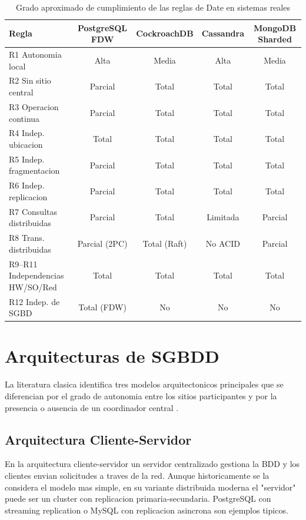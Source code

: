 \documentclass[11pt,a4paper]{article}
\begin{document}
\begin{table}[H]
\centering
\caption{Grado aproximado de cumplimiento de las reglas de Date en sistemas reales}
\small
\begin{tabular}{lcccc}
\toprule
\textbf{Regla} & \textbf{PostgreSQL FDW} & \textbf{CockroachDB} & \textbf{Cassandra} & \textbf{MongoDB Sharded} \\
\midrule
R1 Autonomia local & Alta & Media & Alta & Media \\
R2 Sin sitio central & Parcial & Total & Total & Total \\
R3 Operacion continua & Parcial & Total & Total & Total \\
R4 Indep. ubicacion & Total & Total & Total & Total \\
R5 Indep. fragmentacion & Parcial & Total & Total & Total \\
R6 Indep. replicacion & Parcial & Total & Total & Total \\
R7 Consultas distribuidas & Parcial & Total & Limitada & Parcial \\
R8 Trans. distribuidas & Parcial (2PC) & Total (Raft) & No ACID & Parcial \\
R9--R11 Independencias HW/SO/Red & Total & Total & Total & Total \\
R12 Indep. de SGBD & Total (FDW) & No & No & No \\
\bottomrule
\end{tabular}
\label{tab:datereglas}
\end{table}

\section{Arquitecturas de SGBDD}

La literatura clasica identifica tres modelos arquitectonicos principales que se diferencian por el grado de autonomia entre los sitios participantes y por la presencia o ausencia de un coordinador central \cite{ozsu2020,kleppmann2017}.

\subsection{Arquitectura Cliente-Servidor}

En la arquitectura cliente-servidor un servidor centralizado gestiona la BDD y los clientes envian solicitudes a traves de la red. Aunque historicamente se la considera el modelo mas simple, en su variante distribuida moderna el "servidor" puede ser un cluster con replicacion primaria-secundaria. PostgreSQL con streaming replication o MySQL con replicacion asincrona son ejemplos tipicos.
\end{document}
